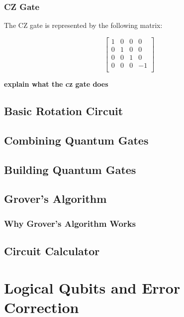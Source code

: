 \documentclass{article}
\begin{document}
\subsubsection{CZ Gate}
\label{sec:czgate}

The CZ gate is represented by the following matrix:

\[
	\begin{bmatrix}
		1 & 0 & 0 & 0 \\
		0 & 1 & 0 & 0 \\
		0 & 0 & 1 & 0 \\
		0 & 0 & 0 & -1 \\
	\end{bmatrix}
\]

\textbf{explain what the cz gate does}



\subsection{Basic Rotation Circuit}
\label{sec:basicrotationcircuit}
\subsection{Combining Quantum Gates}
\label{sec:combininggates}
\subsection{Building Quantum Gates}
\label{sec:buildinggates}
\subsection{Grover's Algorithm}
\label{sec:groversalgorithm}
\subsubsection{Why Grover's Algorithm Works}
\label{sec:whygroverworks}
\subsection{Circuit Calculator}
\label{sec:circuitcalculator}







\section{Logical Qubits and Error Correction}
\label{sec:errorcorrection}
\end{document}
